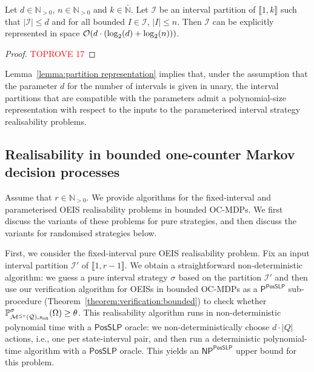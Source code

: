 \documentclass[a4paper,UKenglish,cleveref,autoref,thm-restate,colorlinks]{lipics-v2021}
\newcommand{\init}{\mathsf{init}}
\newcommand{\integerInterval}[1]{\llbracket{}#1\rrbracket{}}
\newcommand{\ptime}{\textsf{P}}
\newcommand{\np}{\textsf{NP}}
\newcommand{\posSLP}{\textsf{PosSLP}}
\newcommand{\IN}{\mathbb{N}}
\newcommand{\INpos}{\IN_{>0}}
\newcommand{\INbar}{\bar{\IN}}
\newcommand{\mdp}{\mathcal{M}}
\newcommand{\ocmdp}{\mathcal{Q}}
\newcommand{\ocmdpFin}[2]{\mdp^{\leq #2}(#1)}
\newcommand{\ocStateSpace}{Q}
\newcommand{\ocCount}{k}
\newcommand{\ocConfig}{s}
\newcommand{\counterUB}{r}
\newcommand{\intPart}{\mathcal{I}}
\newcommand{\interval}{I}
\newcommand{\intNum}{d}
\newcommand{\intSize}{n}
\newcommand{\objective}{\Omega}
\newcommand{\thresProba}{\theta}
\newcommand{\stratGeneric}[1]{{\sigma_{#1}}}
\newcommand{\strat}{\stratGeneric{}}
\begin{document}
\begin{lemma}\label{lemma:partition representation}
  Let $\intNum\in\INpos$, $\intSize\in\INpos$ and $\ocCount\in\INbar$.
  Let $\intPart$ be an interval partition of $\integerInterval{1, \ocCount}$ such that $|\intPart|\leq\intNum$ and for all bounded $\interval\in\intPart$, $|\interval|\leq\intSize$.
  Then $\intPart$ can be explicitly represented in space $\bigo(\intNum\cdot(\log_2(\intNum) + \log_2(\intSize)))$. \end{lemma}
\begin{proof}\textcolor{red}{TOPROVE 17}\end{proof}

Lemma~\ref{lemma:partition representation} implies that, under the assumption that the parameter $\intNum$ for the number of intervals is given in unary, the interval partitions that are compatible with the parameters admit a polynomial-size representation with respect to the inputs to the parameterised interval strategy realisability problems.

\subsection{Realisability in bounded one-counter Markov decision processes}\label{section:realisability:bounded}
Assume that $\counterUB\in\INpos$.
We provide algorithms for the fixed-interval and parameterised OEIS realisability problems in bounded OC-MDPs.
We first discuss the variants of these problems for pure strategies, and then discuss the variants for randomised strategies below.

First, we consider the fixed-interval pure OEIS realisability problem.
Fix an input interval partition $\intPart'$ of $\integerInterval{1, \counterUB-1}$.
We obtain a straightforward non-deterministic algorithm: we guess a pure interval strategy $\strat$ based on the partition $\intPart'$ and then use our verification algorithm for OEISs in bounded OC-MDPs as a $\ptime^{\posSLP}$ sub-procedure (Theorem~\ref{theorem:verification:bounded}) to check whether $\probaGverb{\ocmdpFin{\ocmdp}{\counterUB}}{\ocConfig_\init}{\strat}(\objective)\geq\thresProba$.
This realisability algorithm runs in non-deterministic polynomial time with a $\posSLP$ oracle: we non-deterministically choose $\intNum\cdot|\ocStateSpace|$ actions, i.e., one per state-interval pair, and then run a deterministic polynomial-time algorithm with a $\posSLP$ oracle.
This yields an $\np^{\posSLP}$ upper bound for this problem.
\end{document}
